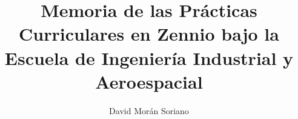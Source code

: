 
\title{Memoria de las Prácticas Curriculares en Zennio bajo la Escuela de Ingeniería Industrial y Aeroespacial}
\author{David Morán Soriano}










\address{UCLM --- Escuela de Ingeniería Industrial y Aeroespacial\\
    Campus Universitario de la Real Fábrica de Armas}
